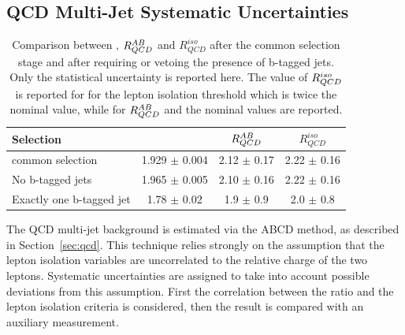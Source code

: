 \subsection{QCD Multi-Jet Systematic Uncertainties}\label{sec:qcdsys}
\begin{table} [!tp]
	\begin{center}
	\begin{tabular}{l  c c c }
\hline 
\hline
Selection  		&  \rqcd  			&  $R_{QCD}^{AB}$  		&  $R_{QCD}^{iso}$ \\ 
\hline
common selection 		&   1.929 $\pm$     0.004	&	2.12 $\pm$ 0.17		&	2.22 $\pm$ 0.16	\\
No b-tagged jets		&  1.965   $\pm$   0.005    	& 2.10   $\pm$	0.16 		&	2.22 $\pm$ 0.16	\\
Exactly one b-tagged jet	&  1.78    $\pm$   0.02 	& 1.9   $\pm$	0.9 		&	2.0  $\pm$ 0.8	\\
\hline
\hline
	\end{tabular}
	  \caption{Comparison between \rqcd, $R_{QCD}^{AB}$ and $R_{QCD}^{iso}$ after the common selection stage and after requiring
	or vetoing the presence of b-tagged jets. Only the statistical uncertainty is reported here.
	The value of $R_{QCD}^{iso}$ is reported for for the lepton isolation threshold which is twice the nominal value,
	while  for  $R_{QCD}^{AB}$ and \rqcd the nominal values are reported. }
	\label{table:MCsub}
	\end{center}
\end{table}

The QCD multi-jet background is estimated via the ABCD method, as
described in Section~\ref{sec:qcd}. This technique relies strongly on
the assumption that the lepton isolation variables are uncorrelated to the relative
charge of the two leptons. Systematic uncertainties
are assigned to take into account possible deviations from this assumption.
First the correlation between the ratio  \rqcd and the lepton isolation criteria is considered,
then the result is compared with an auxiliary measurement. 

